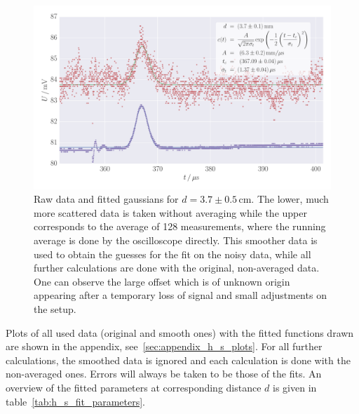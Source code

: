 \begin{figure}
    \includegraphics[width=1.0\textwidth]{figures/haynes_shockley_raw_28}
    \caption{
        Raw data and fitted gaussians for $d = 3.7 \pm 0.5\,$cm. 
        The lower, much more scattered data is taken without averaging 
        while the upper corresponds to the average of 128 measurements, where the 
        running average is done by the oscilloscope directly. This smoother data is 
        used to obtain the guesses for the fit on the noisy data, 
        while all further calculations are done with the original, 
        non-averaged data. 
        One can observe the large offset which is of unknown origin appearing 
        after a temporary loss of signal and small adjustments on the setup.
        }
    \label{fig:h_s_raw_28}
\end{figure}

Plots of all used data (original and smooth ones) with the 
fitted functions drawn are shown in the appendix, 
see~\ref{sec:appendix_h_s_plots}.
For all further calculations, the smoothed data is ignored 
and each calculation is done with the non-averaged ones. 
Errors will always be taken to be those of the fits.
An overview of the fitted parameters at corresponding 
distance $d$ is given in table~\ref{tab:h_s_fit_parameters}.
\renewcommand{\arraystretch}{1.5}
\begin{table}[htdp]
    \centering
    \caption{
        Results of fits with gaussians for all used data sets with distance 
        $d$ between laser and needle. The $\chi^2$-tests are quite high due to the 
        noise and tendencies to ascend on the scale of 10 sigma (compare figures, 
        e.~g.smooth data in figure~\ref{fig:h_s_raw_28}).
        }
    
    \label{tab:h_s_fit_parameters}
\end{table}

